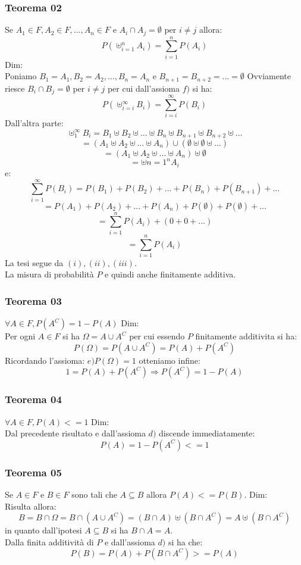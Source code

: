 \subsubsection{Teorema 02}
Se $A_1 \in F, A_2 \in F, ..., A_n \in F$ e $A_i \cap A_j = \emptyset$ per $i \neq j$ allora:
$$ P(\uplus_{i=1}^n A_i) = \sum_{i=1}^n P(A_i)$$
Dim:\\
Poniamo $B_1 = A_1, B_2 = A_2,...,B_n = A_n$ e $B_{n+1} = B_{n+2} = ... = \emptyset$
Ovviamente riesce $B_i \cap B_j = \emptyset$ per $i \neq j$ per cui dall'assioma $f)$ si ha:
$$ P(\uplus_{i=i}^{\infty} B_i) = \sum_{i=i}^{\infty} P(B_i)$$
Dall'altra parte:
$$ \uplus_1^{\infty} B_i = B_1 \uplus B_2 \uplus ... \uplus B_n \uplus B_{n+1} \uplus B_{n+2} \uplus ... $$
$$ = (A_1 \uplus A_2 \uplus ... \uplus A_n) \cup (\emptyset \uplus \emptyset \uplus ...) $$
$$ = (A_1 \uplus A_2 \uplus ... \uplus A_n)\uplus \emptyset $$
$$ = \uplus{n=1}^n A_i $$
e:
$$ \sum_{i=1}^{\infty} P(B_i) = P(B_1) + P(B_2) + ... + P(B_n) + P(B_{n+1}) + ... $$ 
$$ = P(A_1) + P(A_2) + ... + P(A_n) + P(\emptyset) + P(\emptyset) + ... $$
$$ = \sum_{i=1}^n P(A_i) + (0+0+...)$$
$$ = \sum_{i=1}^n P(A_i) $$
La tesi segue da $(i), (ii), (iii)$.\\
La misura di probabilità $P$ e quindi anche finitamente additiva.

\subsubsection{Teorema 03}
$\forall A \in F, P(A^C) = 1 - P(A)$
Dim: \\
Per ogni $A \in F$ si ha $\Omega = A \cup A^C $ per cui essendo $P$ finitamente additivita si ha:
$$ P(\Omega) = P(A \cup A^C) = P(A)+P(A^C)$$
Ricordando l'assioma: $e) P(\Omega)=1$ otteniamo infine:
$$ 1 = P(A)+P(A^C) \Rightarrow P(A^C) = 1 - P(A)$$

\subsubsection{Teorema 04}
$\forall A \in F, P(A) <=1$
Dim:\\
Dal precedente risultato e dall'assioma $d)$ discende immediatamente:
$$ P(A)= 1-P(A^C) <= 1$$

\subsubsection{Teorema 05}
Se $A \in F$ e $B \in F$ sono tali che $A \subseteq B$ allora $P(A) <= P(B)$.
Dim: \\
Risulta allora:
$$ B = B \cap \Omega = B \cap (A \cup A^C) = (B \cap A) \uplus (B \cap A^C) = A \uplus (B \cap A^C)$$
in quanto dall'ipotesi $A \subseteq B$ si ha $B \cap A = A$.\\
Dalla finita additività di $P$ e dall'assioma $d)$ si ha che:
$$ P(B) = P(A) + P(B \cap A^C) >= P(A)$$


